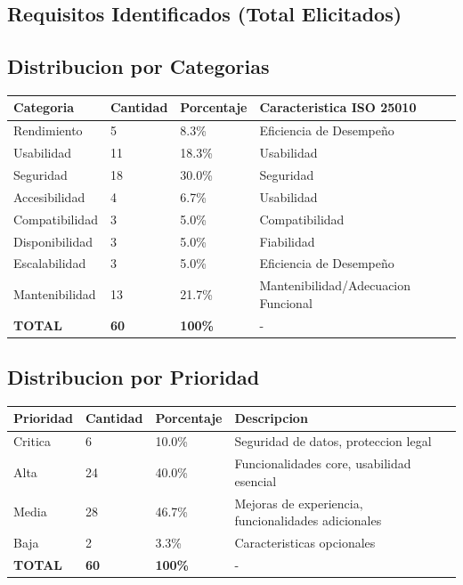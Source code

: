 \documentclass[12pt, a4paper]{article}
\begin{document}
\begin{itemize}
\section{Requisitos Identificados (Total Elicitados)}

\subsection{Distribucion por Categorias}

\begin{longtable}{|p{4cm}|p{2cm}|p{2cm}|p{5cm}|}
\hline
\textbf{Categoria} & \textbf{Cantidad} & \textbf{Porcentaje} & \textbf{Caracteristica ISO 25010} \\
\hline
\endhead

Rendimiento & 5 & 8.3\% & Eficiencia de Desempeño \\
\hline
Usabilidad & 11 & 18.3\% & Usabilidad \\
\hline
Seguridad & 18 & 30.0\% & Seguridad \\
\hline
Accesibilidad & 4 & 6.7\% & Usabilidad \\
\hline
Compatibilidad & 3 & 5.0\% & Compatibilidad \\
\hline
Disponibilidad & 3 & 5.0\% & Fiabilidad \\
\hline
Escalabilidad & 3 & 5.0\% & Eficiencia de Desempeño \\
\hline
Mantenibilidad & 13 & 21.7\% & Mantenibilidad/Adecuacion Funcional \\
\hline
\textbf{TOTAL} & \textbf{60} & \textbf{100\%} & - \\
\hline
\end{longtable}

\subsection{Distribucion por Prioridad}

\begin{longtable}{|p{3cm}|p{2cm}|p{2cm}|p{6cm}|}
\hline
\textbf{Prioridad} & \textbf{Cantidad} & \textbf{Porcentaje} & \textbf{Descripcion} \\
\hline
\endhead

Critica & 6 & 10.0\% & Seguridad de datos, proteccion legal \\
\hline
Alta & 24 & 40.0\% & Funcionalidades core, usabilidad esencial \\
\hline
Media & 28 & 46.7\% & Mejoras de experiencia, funcionalidades adicionales \\
\hline
Baja & 2 & 3.3\% & Caracteristicas opcionales \\
\hline
\textbf{TOTAL} & \textbf{60} & \textbf{100\%} & - \\
\hline
\end{longtable}


\end{itemize}
\end{document}
